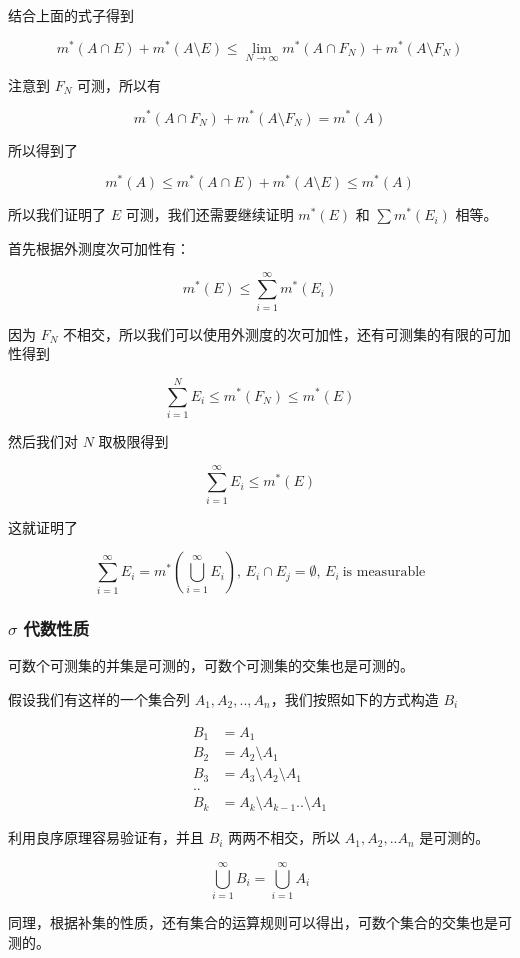 结合上面的式子得到

\[
m^*(A \cap E) + m^*(A \setminus E) \le \lim_{N \to \infty}m^*(A \cap F_N) + m^*(A \setminus F_N)
\]

注意到 $F_N$ 可测，所以有

\[
m^*(A \cap F_N) + m^*(A \setminus F_N) = m^*(A)
\]

所以得到了

\[
m^*(A) \le m^*(A \cap E) + m^*(A \setminus E) \le m^*(A)
\]

所以我们证明了 $E$ 可测，我们还需要继续证明 $m^*(E)$ 和 $\sum m^*(E_i)$ 相等。

首先根据外测度次可加性有：

\[
m^*(E) \le \sum_{i=1}^{\infty}m^*(E_i)
\]

因为 $F_N$ 不相交，所以我们可以使用外测度的次可加性，还有可测集的有限的可加性得到

\[
\sum_{i=1}^{N}E_i \le m^*(F_N) \le m^*(E)
\]

然后我们对 $N$ 取极限得到

\[
\sum_{i=1}^{\infty}E_i \le m^*(E)
\]

这就证明了

\[
\sum_{i=1}^{\infty}E_i = m^*(\bigcup_{i=1}^{\infty}E_i) ,\, E_i \cap E_j = \emptyset ,\, E_i \:\text{is measurable}
\]

\subsubsection{$\sigma$ 代数性质}

可数个可测集的并集是可测的，可数个可测集的交集也是可测的。

假设我们有这样的一个集合列 $A_1, A_2, .., A_n$，我们按照如下的方式构造 $B_i$

\begin{align*}
    B_1 &= A_1 \\
    B_2 &= A_2 \setminus A_1 \\
    B_3 &= A_3 \setminus A_2 \setminus A_1 \\
    .. & \\
    B_k &= A_k \setminus A_{k-1} .. \setminus A_1
\end{align*}

利用良序原理容易验证有，并且 $B_i$ 两两不相交，所以 $A_1, A_2, .. A_n$ 是可测的。

\[
\bigcup_{i=1}^{\infty}B_i = \bigcup_{i=1}^{\infty}A_i
\]

同理，根据补集的性质，还有集合的运算规则可以得出，可数个集合的交集也是可测的。

